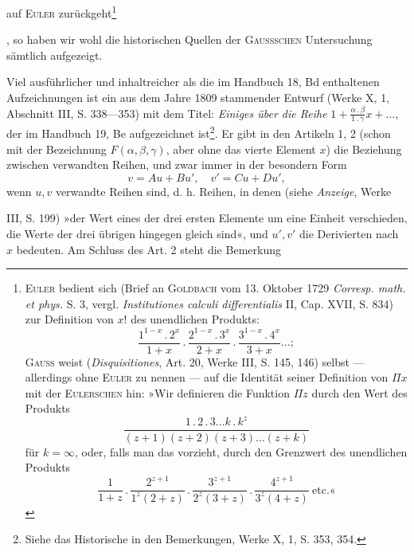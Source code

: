 \noindent auf \textsc{Euler} zurückgeht\begingroup\renewcommand{\thefootnote}{205a)}\footnote{\textsc{Euler} bedient sich (Brief an \textsc{Goldbach} vom 13. Oktober 1729 \textit{Corresp. math. et phys.} S. 3, vergl. \textit{Institutiones calculi differentialis} II, Cap. XVII, S. 834) zur Definition von \(x!\) des unendlichen Produkts:
\[
\frac{1^{1-x}\mathbin{.}2^x}{1+x}\mathbin{.}\frac{2^{1-x}\mathbin{.}3^x}{2+x}\mathbin{.}\frac{3^{1-x}\mathbin{.}4^x}{3+x}\ldots;
\]
\textsc{Gauss} weist (\textit{Disquisitiones}, Art. 20, Werke III, S. 145, 146) selbst — allerdings ohne \textsc{Euler} zu nennen — auf die Identität seiner Definition von \(\Pi x\) mit der \textsc{Eulerschen} hin: »Wir definieren die Funktion \(\Pi z\) durch den Wert des Produkts
\[
\frac{1\mathbin{.}2\mathbin{.}3\ldots k\mathbin{.}k^z}{(z+1)(z+2)(z+3)\ldots(z+k)}
\]
für \(k=\infty\), oder, falls man das vorzieht, durch den Grenzwert des unendlichen Produkts
\[
\frac{1}{1+z}\mathbin{.}\frac{2^{z+1}}{1^z(2+z)}\mathbin{.}\frac{3^{z+1}}{2^z(3+z)}\mathbin{.}\frac{4^{z+1}}{3^z(4+z)}\ \text{etc.«}
\]
}\addtocounter{footnote}{-1}\endgroup, so haben wir wohl die historischen Quellen der
\textsc{Gaussschen} Untersuchung sämtlich aufgezeigt.
\par
Viel ausführlicher und inhaltreicher als die im Handbuch 18, Bd enthaltenen
Aufzeichnungen ist ein aus dem Jahre 1809 stammender Entwurf
(Werke X, 1, Abschnitt III, S. 338—353) mit dem Titel: \textit{Einiges über die Reihe}
\(1+\frac{\alpha\mathbin{.}\beta}{1\mathbin{.}\gamma}x+\ldots\), der im Handbuch 19, Be aufgezeichnet ist\footnote{Siehe das Historische in den Bemerkungen, Werke X, 1, S. 353, 354.}. Er gibt in
den Artikeln 1, 2 (schon mit der Bezeichnung \(F(\alpha,\beta,\gamma)\), aber ohne das vierte
Element \(x\)) die Beziehung zwischen verwandten Reihen, und zwar immer in
der besondern Form
\begingroup\makeatletter\tagsleft@true\let\veqno\leqno\makeatother
\begin{equation*}
v=Au+Bu',\quad v'=Cu+Du',\tag{11}
\end{equation*}\endgroup
\noindent wenn \(u,v\) verwandte Reihen sind, d. h. Reihen, in denen (siehe \textit{Anzeige}, Werke\par
\HistoricalFoot{}{18\textsuperscript{*}}
\clearpage{}
\noindent III, S. 199) »der Wert eines der drei ersten Elemente um eine Einheit verschieden,
die Werte der drei übrigen hingegen gleich sind«, und \(u',v'\) die
Derivierten nach \(x\) bedeuten. Am Schluss des Art. 2 steht die Bemerkung
